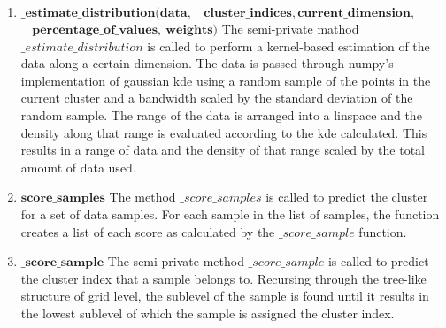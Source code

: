 \begin{enumerate}
{    If the previous and next values are both less than that of the current value, then the current index is added to the list of peaks.}
    \item $\mathbf{\_estimate\_distribution( data, }$\newline $\mathbf{~~~~ cluster\_indices, current\_dimension,}$\newline $\mathbf{~~~~  percentage\_of\_values,~weights )}$\newline
    {The semi-private mathod $\_estimate\_distribution$ is called to perform a kernel-based estimation of the data along a certain dimension.
    The data is passed through numpy's implementation of gaussian kde using a random sample of the points in the current cluster and a bandwidth scaled by the standard deviation of the random sample.
    The range of the data is arranged into a linspace and the density along that range is evaluated according to the kde calculated.
    This results in a range of data and the density of that range scaled by the total amount of data used.}
    \item $\mathbf{score\_samples}$\newline
    {The method $\_score\_samples$ is called to predict the cluster for a set of data samples.
    For each sample in the list of samples, the function creates a list of each score as calculated by the $\_score\_sample$ function.}
    \item $\mathbf{\_score\_sample}$\newline
    {The semi-private method $\_score\_sample$ is called to predict the cluster index that a sample belongs to.
    Recursing through the tree-like structure of grid level, the sublevel of the sample is found until it results in the lowest sublevel of which the sample is assigned the cluster index.}
\end{enumerate}

